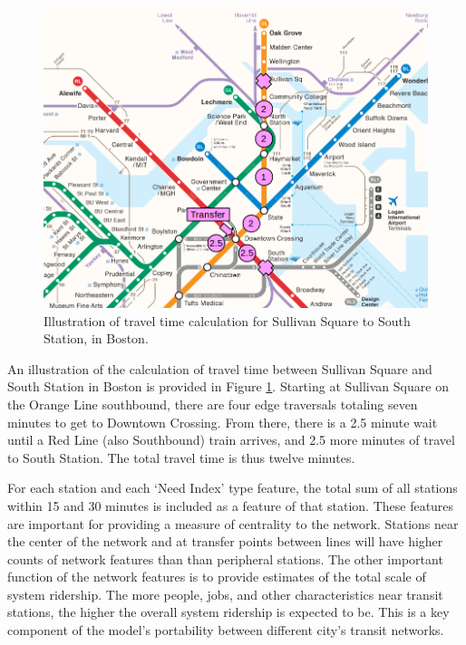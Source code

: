 \documentclass[11pt]{article}
\begin{document}
\begin{figure}
\begin{center}\includegraphics[scale=0.7]{transfer_demonstration}\end{center}\caption{Illustration of travel time calculation for Sullivan Square to South Station, in Boston.}\label{fig:f2}
\end{figure}

An illustration of the calculation of travel time between Sullivan Square and South Station in Boston is provided in Figure \ref{fig:f2}. Starting at Sullivan Square on the Orange Line southbound, there are four edge traversals totaling seven minutes to get to Downtown Crossing. From there, there is a 2.5 minute wait until a Red Line (also Southbound) train arrives, and 2.5 more minutes of travel to South Station. The total travel time is thus twelve minutes. 

For each station and each `Need Index' type feature, the total sum of all stations within 15 and 30 minutes is included as a feature of that station. These features are important for providing a measure of centrality to the network. Stations near the center of the network and at transfer points between lines will have higher counts of network features than than peripheral stations. The other important function of the network features is to provide estimates of the total scale of system ridership. The more people, jobs, and other characteristics near transit stations, the higher the overall system ridership is expected to be. This is a key component of the model's portability between different city's transit networks. 
\end{document}
